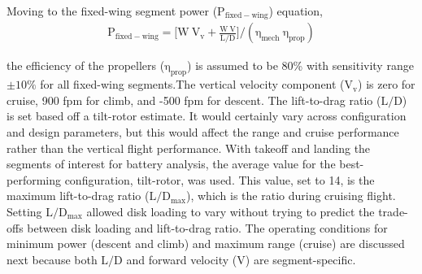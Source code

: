 \documentclass{achemso}
\begin{document}
\noindent Moving to the fixed-wing segment power ($\mathrm{P_{fixed-wing}}$) equation, \cite{Raymer}
\begin{gather*}
    \mathrm{P_{fixed-wing} = \Big[ W\ V_v + \frac{W\ V}{L/D}\Big] / (\eta_{mech}\ \eta_{prop})}
    \label{eqn:fixedP}
\end{gather*}

the efficiency of the propellers ($\mathrm{\eta_{prop}}$) is assumed to be 80\%\cite{Raymer}  with sensitivity range $\mathrm{\pm 10\%}$ for all fixed-wing segments.The vertical velocity component ($\mathrm{V_v}$) is zero for cruise, 900 fpm for climb, and -500 fpm for descent. The lift-to-drag ratio ($\mathrm{{L}/{D}}$) is set based off a tilt-rotor estimate. \cite{uberMcDonald} It would certainly vary across configuration and design parameters, but this would affect the range and cruise performance rather than the vertical flight performance. With takeoff and landing the segments of interest for battery analysis, the average value for the best-performing configuration, tilt-rotor, was used. This value, set to 14, is the maximum lift-to-drag ratio ($\mathrm{{L}/{D}_{max}}$), which is the ratio during cruising flight. Setting $\mathrm{{L}/{D}_{max}}$ allowed disk loading to vary without trying to predict the trade-offs between disk loading and lift-to-drag ratio. The operating conditions for minimum power (descent and climb) and maximum range (cruise) are discussed next because both $\mathrm{{L}/{D}}$ and forward velocity ($\mathrm{V}$) are segment-specific. 

\end{document}
